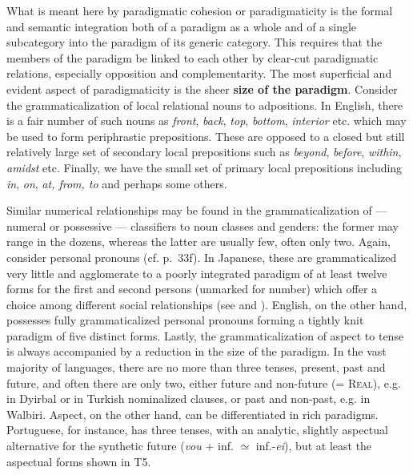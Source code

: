 What is meant here by paradigmatic cohesion or paradigmaticity is the formal and semantic integration both of a paradigm as a whole and of a single subcategory into the paradigm of its generic category. This requires that the members of the paradigm be linked to each other by clear-cut paradigmatic relations, especially opposition and complementarity. The most superficial and evident aspect of paradigmaticity is the sheer \textbf{size of the paradigm}. Consider the grammaticalization of local relational nouns to adpositions. In English, there is a fair number of such nouns as \textit{front}, \textit{back}, \textit{top}, \textit{bottom}, \textit{interior} etc. which may be used to form periphrastic prepositions. These are opposed to a closed but still relatively large set of secondary local prepositions such as \textit{beyond}, \textit{before}, \textit{within}, \textit{amidst} etc. Finally, we have the small set of primary local prepositions including \textit{in}, \textit{on}, \textit{at, from, to} and perhaps some others.

Similar numerical relationships may be found in the grammaticalization of — numeral or possessive — classifiers to noun classes and genders: the former may range in the dozens, whereas the latter are usually few, often only two. Again, consider personal pronouns (cf. p.~33f). In Japanese, these are grammaticalized very little and agglomerate to a poorly integrated paradigm of at least twelve forms for the first and second persons (unmarked for number) which offer a choice among different social relationships (see \citet{Alpatov1980} and \citet{Coulmas1980}). English, on the other hand, possesses fully grammaticalized personal pronouns forming a tightly knit paradigm of five distinct forms. Lastly, the grammaticalization of aspect to tense is always accompanied by a reduction in the size of the paradigm. In the vast majority of languages, there are no more than three tenses, present, past and future, and often there are only two, either future and non-future (= \textsc{Real}), e.g. in Dyirbal or in Turkish nominalized clauses, or past and non-past, e.g. in Walbiri. Aspect, on the other hand, can be differentiated in rich paradigms. Portuguese, for instance, has three tenses, with an analytic, slightly aspectual alternative for the synthetic future (\textit{vou} + inf. ${\simeq}$ inf.-\textit{ei}), but at least the aspectual forms shown in T5.

